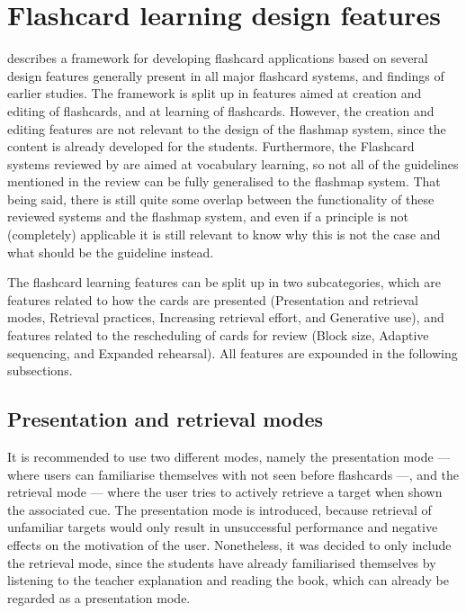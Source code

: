     \section{Flashcard learning design features}

 describes a framework for developing flashcard applications based on several design features generally present in all major flashcard systems, and findings of earlier studies. The framework is split up in features aimed at creation and editing of flashcards, and at learning of flashcards. However, the creation and editing features are not relevant to the design of the flashmap system, since the content is already developed for the students. Furthermore, the Flashcard systems reviewed by  are aimed at vocabulary learning, so not all of the guidelines mentioned in the review can be fully generalised to the flashmap system. That being said, there is still quite some overlap between the functionality of these reviewed systems and the flashmap system, and even if a principle is not (completely) applicable it is still relevant to know why this is not the case and what should be the guideline instead.

The flashcard learning features can be split up in two subcategories, which are features related to how the cards are presented (Presentation and retrieval modes, Retrieval practices, Increasing retrieval effort, and Generative use), and features related to the rescheduling of cards for review (Block size, Adaptive sequencing, and Expanded rehearsal). All features are expounded in the following subsections.

        \subsection{Presentation and retrieval modes}

It is recommended to use two different modes, namely the presentation mode --- where users can familiarise themselves with not seen before flashcards ---, and the retrieval mode --- where the user tries to actively retrieve a target when shown the associated cue. The presentation mode is introduced, because retrieval of unfamiliar targets would only result in unsuccessful performance and negative effects on the motivation of the user. Nonetheless, it was decided to only include the retrieval mode, since the students have already familiarised themselves by listening to the teacher explanation and reading the book, which can already be regarded as a presentation mode.


